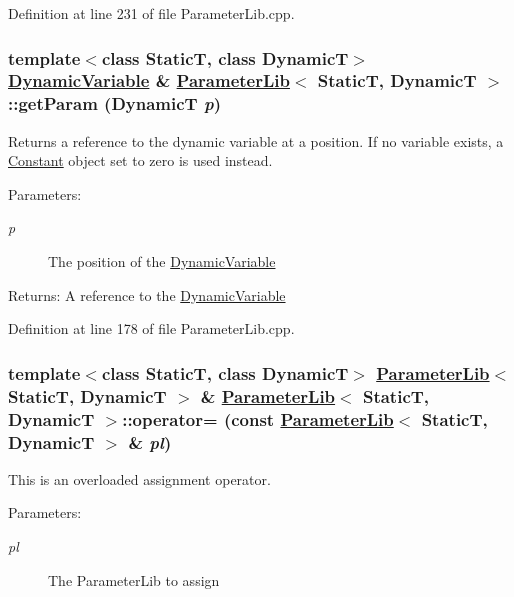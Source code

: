 Definition at line 231 of file Parameter\-Lib.cpp.\hypertarget{classParameterLib_a6}{
\subsubsection[getParam]{\setlength{\rightskip}{0pt plus 5cm}template$<$class Static\-T, class Dynamic\-T$>$ \hyperlink{classDynamicVariable}{Dynamic\-Variable} \& \hyperlink{classParameterLib}{Parameter\-Lib}$<$ Static\-T, Dynamic\-T $>$::get\-Param (Dynamic\-T {\em p})}}
\label{classParameterLib_a6}


Returns a reference to the dynamic variable at a position. If no variable exists, a \hyperlink{classConstant}{Constant} object set to zero is used instead. \begin{Desc}
\item[Parameters:]
\begin{description}
\item[{\em p}]The position of the \hyperlink{classDynamicVariable}{Dynamic\-Variable} \end{description}
\end{Desc}
\begin{Desc}
\item[Returns:]A reference to the \hyperlink{classDynamicVariable}{Dynamic\-Variable} \end{Desc}


Definition at line 178 of file Parameter\-Lib.cpp.\hypertarget{classParameterLib_a2}{
\subsubsection[operator=]{\setlength{\rightskip}{0pt plus 5cm}template$<$class Static\-T, class Dynamic\-T$>$ \hyperlink{classParameterLib}{Parameter\-Lib}$<$ Static\-T, Dynamic\-T $>$ \& \hyperlink{classParameterLib}{Parameter\-Lib}$<$ Static\-T, Dynamic\-T $>$::operator= (const \hyperlink{classParameterLib}{Parameter\-Lib}$<$ Static\-T, Dynamic\-T $>$ \& {\em pl})}}
\label{classParameterLib_a2}


This is an overloaded assignment operator. \begin{Desc}
\item[Parameters:]
\begin{description}
\item[{\em pl}]The Parameter\-Lib to assign \end{description}
\end{Desc}


